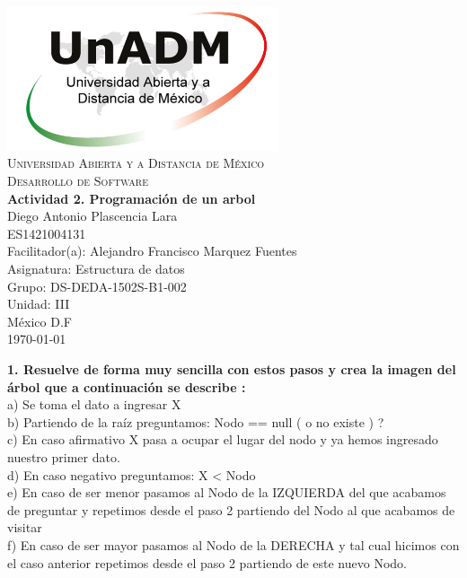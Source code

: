 \documentclass[spanish,12pt,letterpapper]{article}
\begin{document}
	\begin{titlepage}
		\begin{center}
			\includegraphics[width=0.6\textwidth]{../logoUnADM}~\\[1cm] 
			\textsc{Universidad Abierta y a Distancia de M\'exico}\\[0.8cm]
			\textsc{Desarrollo de Software}\\[1.8cm]
			
			\textbf{ \Large Actividad 2. Programación de un arbol}\\[3cm]
			
			Diego Antonio Plascencia Lara\\ ES1421004131 \\[0.4cm]
			Facilitador(a): Alejandro Francisco Marquez Fuentes\\
			Asignatura: Estructura de datos\\
			Grupo: DS-DEDA-1502S-B1-002 \\
			Unidad: III \\
			
			\vfill M\'exico D.F\\{\today}
			
		\end{center}
	\end{titlepage}
	
	\textbf{1. Resuelve de forma muy sencilla con estos pasos y crea la imagen del árbol que a continuación se describe :\\}
	a) Se toma el dato a ingresar X\\
	b) Partiendo de la raíz preguntamos: Nodo == null ( o no existe ) ?\\
	c) En caso afirmativo X pasa a ocupar el lugar del nodo y ya hemos ingresado nuestro primer dato.\\
	d) En caso negativo preguntamos: X < Nodo\\
	e) En caso de ser menor pasamos al Nodo de la IZQUIERDA del que acabamos de preguntar y repetimos desde el paso 2 partiendo del Nodo al que acabamos de visitar\\
	f) En caso de ser mayor pasamos al Nodo de la DERECHA y tal cual hicimos con el caso anterior repetimos desde el paso 2 partiendo de este nuevo Nodo.\\
	
\end{document}
